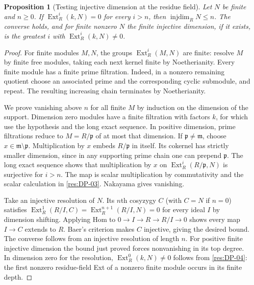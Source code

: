 \documentclass[11pt,oneside,openany]{book}
\newtheorem{proposition}[theorem]{Proposition}
\theoremstyle{definition}
\theoremstyle{remark}
\begin{document}
\begin{proposition}[Testing injective dimension at the residue field]
\label{res:GC-02}
Let $N$ be finite and $n\ge0$. If
$\operatorname{Ext}^i_R(k,N)=0$ for every $i>n$, then
$\operatorname{injdim}_R N\le n$. The converse holds, and
for finite nonzero $N$ the finite injective dimension, if it
exists, is the greatest $i$ with $\operatorname{Ext}^i_R(k,N)\ne0$.
\end{proposition}
\begin{proof}
For finite modules $M,N$, the groups $\operatorname{Ext}^i_R(M,N)$
are finite: resolve $M$ by finite free modules, taking each next
kernel finite by Noetherianity. Every finite module has a finite
prime filtration. Indeed, in a nonzero remaining quotient choose
an associated prime and the corresponding cyclic submodule, and
repeat. The resulting increasing chain terminates by Noetherianity.

We prove vanishing above $n$ for all finite $M$ by induction on
the dimension of the support. Dimension zero modules have a
finite filtration with factors $k$, for which use the hypothesis
and the long exact sequence. In positive dimension, prime
filtrations reduce to $M=R/\mathfrak p$ of at most that dimension.
If $\mathfrak p\ne\mathfrak m$, choose $x\in\mathfrak m
\setminus\mathfrak p$. Multiplication by $x$ embeds $R/\mathfrak p$
in itself. Its cokernel has strictly smaller dimension, since in
any supporting prime chain one can prepend $\mathfrak p$. The long
exact sequence shows that multiplication by $x$ on
$\operatorname{Ext}^i_R(R/\mathfrak p,N)$ is surjective for $i>n$.
The map is scalar multiplication by commutativity and the scalar
calculation in \ref{res:DP-03}. Nakayama gives vanishing.

Take an injective resolution of $N$. Its $n$th cosyzygy $C$
(with $C=N$ if $n=0$) satisfies
$\operatorname{Ext}^1_R(R/I,C)=\operatorname{Ext}^{n+1}_R(R/I,N)=0$
for every ideal $I$ by dimension shifting. Applying Hom to
$0\to I\to R\to R/I\to0$ shows every map $I\to C$ extends to $R$.
Baer's criterion makes $C$ injective, giving the desired bound.
The converse follows from an injective resolution of length $n$.
For positive finite injective dimension the bound just proved
forces nonvanishing in its top degree. In dimension zero for the
resolution, $\operatorname{Ext}^0_R(k,N)\ne0$ follows from
\ref{res:DP-04}: the first nonzero residue-field Ext of a nonzero
finite module occurs in its finite depth.
\end{proof}
\end{document}
